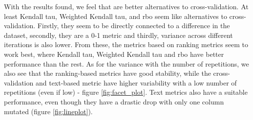 
With the results found, we feel that are better alternatives to cross-validation. At least  Kendall tau, Weighted Kendall tau, and \ac{rbo} seem like alternatives to cross-validation.
Firstly, they seem to be directly connected to a difference in the dataset, secondly, they are a 0-1 metric and thirdly, variance across different iterations is also lower.
From these, the metrics based on ranking metrics seem to work best, where Kendall tau, Weighted Kendall tau and \ac{rbo} have better performance than the rest. As for the variance with the number of repetitions, we also see that the ranking-based metrics have good stability, while the cross-validation and text-based metric have higher variability with a low number of repetitions (even if low) - figure \ref{fig:facet_plot}. 
Text metrics also have a suitable performance, even though they have a drastic drop with only one column mutated (figure \ref{fig:lineplot}).

